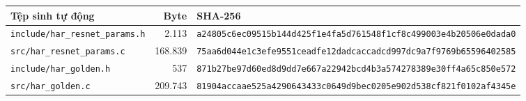 \begin{tabular}{lrl}
\toprule
Tệp sinh tự động & Byte & SHA-256 \\
\midrule
\texttt{include/har\_resnet\_params.h} & 2.113 & \texttt{\scriptsize a24805c6ec09515b144d425f1e4fa5d761548f1cf8c499003e4b20506e0dada0} \\
\texttt{src/har\_resnet\_params.c} & 168.839 & \texttt{\scriptsize 75aa6d044e1c3efe9551ceadfe12dadcaccadcd997dc9a7f9769b65596402585} \\
\texttt{include/har\_golden.h} & 537 & \texttt{\scriptsize 871b27be97d60ed8d9dd7e667a22942bcd4b3a574278389e30ff4a65c850e572} \\
\texttt{src/har\_golden.c} & 209.743 & \texttt{\scriptsize 81904accaae525a4290643433c0649d9bec0205e902d538cf821f0102af4345e} \\
\bottomrule
\end{tabular}
